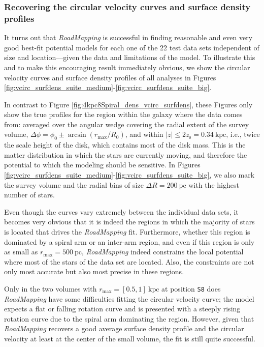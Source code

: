 \documentclass[iop,revtex4,numberedappendix,appendixfloats]{emulateapj}
\newcommand{\RM}{{\sl RoadMapping}}
\begin{document}
\subsubsection{Recovering the circular velocity curves and surface density profiles} \label{sec:circvel_surfdens}

It turns out that \RM{} is successful in finding reasonable and even very good best-fit potential models for each one of the 22 test data sets independent of size and location---given the data and limitations of the model. To illustrate this and to make this encouraging result immediately obvious, we show the circular velocity curves and surface density profiles of all analyses in Figures \ref{fig:vcirc_surfdens_suite_medium}-\ref{fig:vcirc_surfdens_suite_big}. 

In contrast to Figure \ref{fig:4kpc8Spiral_dens_vcirc_surfdens}, these Figures only show the true profiles for the region within the galaxy where the data comes from: averaged over the angular wedge covering the radial extent of the survey volume, $\Delta \phi = \phi_0 \pm \arcsin(r_\text{max}/R_0)$, and within $|z| \leq 2 z_\text{s} = 0.34~\text{kpc}$, i.e., twice the scale height of the disk, which contains most of the disk mass. This is the matter distribution in which the stars are currently moving, and therefore the potential to which the modeling should be sensitive. In Figures \ref{fig:vcirc_surfdens_suite_medium}-\ref{fig:vcirc_surfdens_suite_big}, we also mark the survey volume and the radial bins of size $\Delta R =200~\text{pc}$ with the highest number of stars. 

Even though the curves vary extremely between the individual data sets, it becomes very obvious that it is indeed the regions in which the majority of stars is located that drives the \RM{} fit. Furthermore, whether this region is dominated by a spiral arm or an inter-arm region, and even if this region is only as small as $r_\text{max}=500~\text{pc}$, \RM{} indeed constrains the local potential where most of the stars of the data set are located. Also, the constraints are not only most accurate but also most precise in these regions.

Only in the two volumes with $r_\text{max}=[0.5,1]~\text{kpc}$ at position \texttt{S8} does \RM{} have some difficulties fitting the circular velocity curve; the model expects a flat or falling rotation curve and is presented with a steeply rising rotation curve due to the spiral arm dominating the region. However, given that \RM{} recovers a good average surface density profile and the circular velocity at least at the center of the small volume, the fit is still quite successful. 
\end{document}
